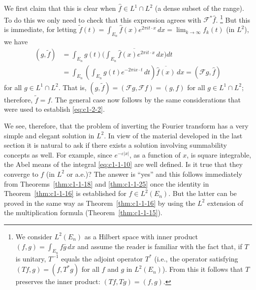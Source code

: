 We first claim that this is clear when $\hat{f} \in L^{1} \cap L^{2}$ (a dense
subset of the range). To do this we only need to check that this expression
agrees with $\mathcal{F}^{*}\hat{f}$.%
\footnote{We consider $L^{2}(E_{n})$ as a Hilbert space with inner product
$(f, g) = \int_{E_{n}} f\bar{g} \, dx$ and assume the reader is familiar with
the fact that, if $T$ is unitary, $T^{-1}$ equals the adjoint operator $T^{*}$
(i.e., the operator satisfying $(Tf, g) = (f, T^{*}g)$ for all $f$ and $g$ in
$L^{2}(E_{n})$). From this it follows that $T$ preserves the inner product:
$(Tf, Tg) = (f, g)$.}
But this is immediate, for letting
$\tilde{f}(t) = \int_{E_{n}} \hat{f}(x) e^{2\pi i t \cdot x} \, dx = \lim_{k \to \infty} f_{k}(t)$
(in $L^{2}$), we have
\begin{align*}
(g,\tilde{f})
&=\int_{E_{n}}g(t)\Biggl(\overline{\int_{E_{n}}\hat{f}(x)e^{2\pi i t\cdot x}\,dx}\Biggr)dt\\
&=\int_{E_{n}}\left(\int_{E_{n}}g(t)e^{-2\pi i x\cdot t}\,dt\right)\overline{\hat{f}(x)}\,dx
=(\mathcal{F}g,\hat{f})
\end{align*}
for all $g \in L^{1} \cap L^{2}$. That is,
$(g, \tilde{f}) = (\mathcal{F}g, \mathcal{F}f) = (g, f)$ for all
$g \in L^{1} \cap L^{2}$; therefore, $\tilde{f} = f$. The general case now
follows by the same considerations that were used to establish
\eqref{eq:c1-2-2}.

We see, therefore, that the problem of inverting the Fourier transform has a
very simple and elegant solution in $L^{2}$. In view of the material
developed in the last section it is natural to ask if there exists a solution
involving summability concepts as well. For example, since
$e^{-\varepsilon|x|}$, as a function of $x$, is square integrable, the Abel
means of the integral \eqref{eq:c1-1-10} are well defined. Is it true that
they converge to $f$ (in $L^{2}$ or a.e.)? The answer is ``yes'' and this
follows immediately from Theorems~\ref{thm:c1-1-18} and \ref{thm:c1-1-25} once
the identity in Theorem~\ref{thm:c1-1-16} is established for
$f \in L^{2}(E_{n})$. But the latter can be proved in the same way as
Theorem~\ref{thm:c1-1-16} by using the $L^{2}$ extension of the multiplication
formula (Theorem~\ref{thm:c1-1-15}).

